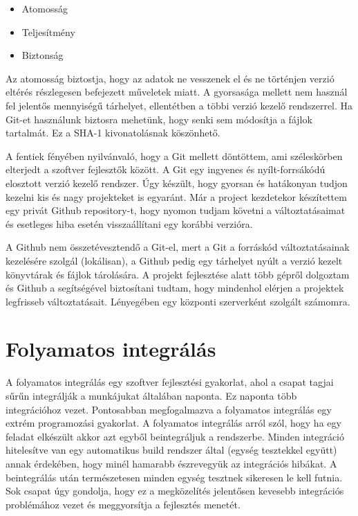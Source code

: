 \documentclass{thesis-ekf}
\theoremstyle{definition}
\theoremstyle{remark}
\begin{document}
\begin{itemize}
	\item Atomosság
	\item Teljesítmény
	\item Biztonság
\end{itemize}

Az atomosság biztostja, hogy az adatok ne vesszenek el és ne történjen verzió eltérés részlegesen befejezett műveletek miatt.
A gyorsasága mellett nem használ fel jelentős mennyiségű tárhelyet, ellentétben a többi verzió kezelő rendszerrel.
Ha Git-et használunk biztosra mehetünk, hogy senki sem módosítja a fájlok tartalmát. Ez a SHA-1 kivonatolásnak köszönhető.\cite{git}

A fentiek fényében nyilvánvaló, hogy a Git mellett döntöttem, ami széleskörben elterjedt a szoftver fejlesztők között.
A Git egy ingyenes és nyílt-forrsákódú elosztott verzió kezelő rendszer. Úgy készült, hogy gyorsan és hatákonyan tudjon kezelni kis és nagy projekteket is egyaránt.
Már a project kezdetekor készítettem egy privát Github repository-t, hogy nyomon tudjam követni a változtatásaimat és esetleges hiba esetén visszaállítani egy korábbi verzióra.

A Github nem összetévesztendő a Git-el, mert a Git a forráskód változtatásainak kezelésére szolgál (lokálisan), a Github pedig egy tárhelyet nyúlt a verzió kezelt könyvtárak és fájlok tárolására.
A projekt fejlesztése alatt több gépről dolgoztam és Github a segítségével biztosítani tudtam, hogy mindenhol elérjen a projektek legfrisseb változtatásait.
Lényegében egy központi szerverként szolgált számomra.

\section{Folyamatos integrálás}

A folyamatos integrálás egy szoftver fejlesztési gyakorlat, ahol a csapat tagjai sűrűn integrálják a munkájukat általában naponta. 
Ez naponta több integrációhoz vezet. Pontosabban megfogalmazva a folyamatos integrálás egy extrém programozási gyakorlat.
A folyamatos integrálás arról szól, hogy ha egy feladat elkészült akkor azt egyből beintegráljuk a rendszerbe.
Minden integráció hitelesítve van egy automatikus build rendszer által (egység tesztekkel együtt) annak érdekében, hogy minél hamarabb észrevegyük az integrációs hibákat.
A beintegrálás után természetesen minden egység tesztnek sikeresen le kell futnia.
Sok csapat úgy gondolja, hogy ez a megközelítés jelentősen kevesebb integrációs problémához vezet és meggyorsítja a fejlesztés menetét.\cite{continuous_integration}
\end{document}
